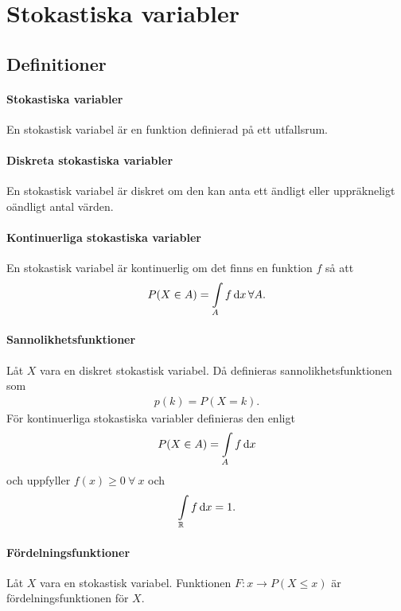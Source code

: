 \section{Stokastiska variabler}

\subsection{Definitioner}

\paragraph{Stokastiska variabler}
En stokastisk variabel är en funktion definierad på ett utfallsrum.

\paragraph{Diskreta stokastiska variabler}
En stokastisk variabel är diskret om den kan anta ett ändligt eller uppräkneligt oändligt antal värden.

\paragraph{Kontinuerliga stokastiska variabler}
En stokastisk variabel är kontinuerlig om det finns en funktion $f$ så att
\begin{align*}
	P(X\in A) = \int\limits_{A}{}f\dd{x}\forall A.
\end{align*}

\paragraph{Sannolikhetsfunktioner}
Låt $X$ vara en diskret stokastisk variabel. Då definieras sannolikhetsfunktionen som
\begin{align*}
	p(k) = P(X = k).
\end{align*}
För kontinuerliga stokastiska variabler definieras den enligt
\begin{align*}
	P(X\in A) = \int\limits_{A}{}f\dd{x}
\end{align*}
och uppfyller $f(x)\geq 0\ \forall\ x$ och
\begin{align*}
	\int\limits_{\mathbb{R}}{}f\dd{x} = 1.
\end{align*}

\paragraph{Fördelningsfunktioner}
Låt $X$ vara en stokastisk variabel. Funktionen $F: x\to P(X\leq x)$ är fördelningsfunktionen för $X$.

